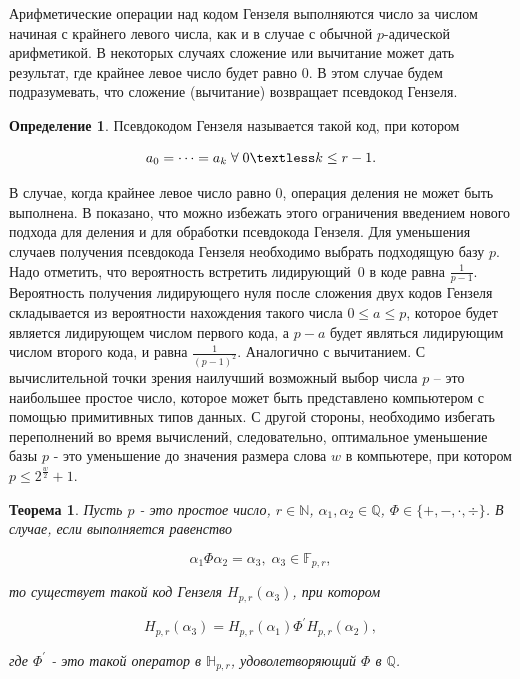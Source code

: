 \documentclass[master, och, diploma, times]{sty/SCWorks}
\theoremstyle{plain}
\newtheorem{thethm}{Теорема}[section]
\theoremstyle{definition}
\newtheorem{defn}{Определение}[section]
\numberwithin{equation}{section}
\begin{document}
Арифметические операции над кодом Гензеля выполняются число за числом начиная с крайнего левого числа, как и в случае с обычной $p$-адической арифметикой. В некоторых случаях сложение или вычитание может дать результат, где крайнее левое число будет равно $0$. В этом случае будем подразумевать, что сложение (вычитание) возвращает псевдокод Гензеля.

\begin{defn}
Псевдокодом Гензеля называется такой код, при котором 

\begin{equation}
a_0=\dots=a_k \; \forall \; 0 \textless k \leq r-1.
\end{equation}

\end{defn}

В случае, когда крайнее левое число равно $0$, операция деления не может быть выполнена. В \cite{bib:numbers:limongelli} показано, что можно избежать этого ограничения \mbox{введением} нового подхода для деления и для обработки псевдокода \mbox{Гензеля}.
Для уменьшения случаев получения псевдокода Гензеля \mbox{необходимо} выбрать подходящую базу $p$. Надо отметить, что вероятность встретить \mbox{лидирующий $0$} в коде равна $\frac{1}{p-1}$. Вероятность получения лидирующего нуля после \mbox{сложения} двух кодов Гензеля складывается из вероятности нахождения такого числа $0 \leq a \leq p$, которое будет является лидирующем числом первого кода, а $p-a$ будет являться лидирующим числом второго кода, и равна $\frac{1}{{(p-1)}^{2}}$. Аналогично с вычитанием. С вычислительной точки зрения наилучший возможный выбор числа $p$ -- это наибольшее простое число, которое может быть представлено компьютером с помощью примитивных типов данных. С другой стороны, необходимо избегать переполнений во время вычислений, следовательно, оптимальное уменьшение базы $p$ - это уменьшение до значения размера слова $w$ в компьютере, при котором $p \leq 2^\frac{w}{2}+1$.

\begin{thethm}\label{th:hensel}
Пусть $p$ - это простое число, $r \in \mathbb{N}$, $\alpha_1, \alpha_2 \in \mathbb{Q}$, $\Phi \in \{+, -, \cdot , \div \}$. В случае, если выполняется равенство

\begin{equation}
\alpha_1\Phi \alpha_2 = \alpha_3, \; \alpha_3 \in \mathbb{F}_{p,r},
\end{equation}

\noindent то существует такой код Гензеля $H_{p,r}(\alpha_3)$, при котором

\begin{equation}
H_{p,r}(\alpha_3)=H_{p,r}(\alpha_1)\Phi^{'}H_{p,r}(\alpha_2),
\end{equation}

\noindent где $\Phi^{'}$ - это такой оператор в $\mathbb{H}_{p,r}$, удоволетворяющий $\Phi$ в $\mathbb{Q}$.

\end{thethm}
\end{document}
